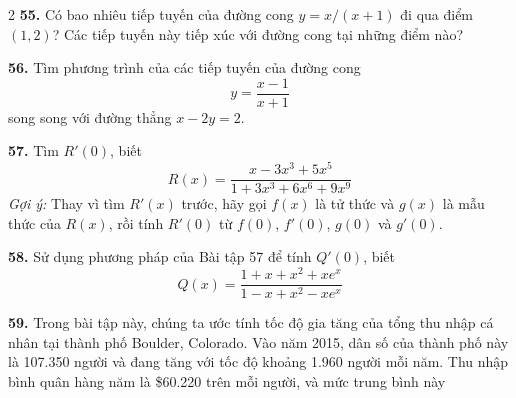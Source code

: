 \begin{multicols}{2}
\noindent\textbf{55.} Có bao nhiêu tiếp tuyến của đường cong $y = x/(x + 1)$ đi qua điểm $(1, 2)$? Các tiếp tuyến này tiếp xúc với đường cong tại những điểm nào?

\noindent\textbf{56.} Tìm phương trình của các tiếp tuyến của đường cong
\[
y = \frac{x - 1}{x + 1}
\]
song song với đường thẳng $x - 2y = 2$.

\noindent\textbf{57.} Tìm $R'(0)$, biết
\[
R(x) = \frac{x - 3x^3 + 5x^5}{1 + 3x^3 + 6x^6 + 9x^9}
\]
\textit{Gợi ý:} Thay vì tìm $R'(x)$ trước, hãy gọi $f(x)$ là tử thức và $g(x)$ là mẫu thức của $R(x)$, rồi tính $R'(0)$ từ $f(0)$, $f'(0)$, $g(0)$ và $g'(0)$.

\noindent\textbf{58.} Sử dụng phương pháp của Bài tập 57 để tính $Q'(0)$, biết
\[
Q(x) = \frac{1 + x + x^2 + xe^x}{1 - x + x^2 - xe^x}
\]

\noindent\textbf{59.} Trong bài tập này, chúng ta ước tính tốc độ gia tăng của tổng thu nhập cá nhân tại thành phố Boulder, Colorado. Vào năm 2015, dân số của thành phố này là 107.350 người và đang tăng với tốc độ khoảng 1.960 người mỗi năm. Thu nhập bình quân hàng năm là \$60.220 trên mỗi người, và mức trung bình này

\end{multicols}
